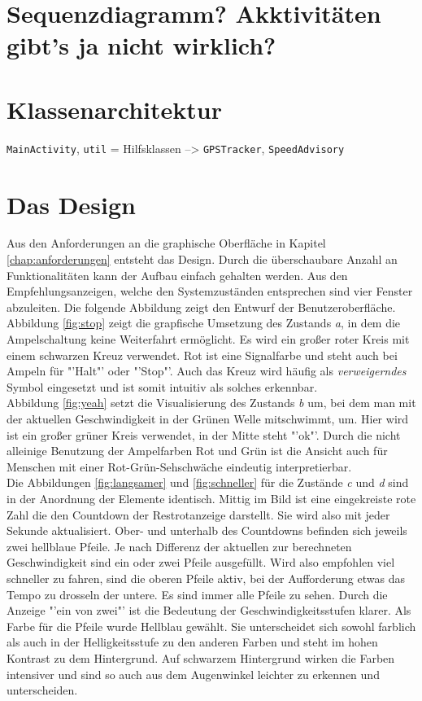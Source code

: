 \section{Sequenzdiagramm? Akktivitäten gibt's ja nicht wirklich?}
\section{Klassenarchitektur}
\texttt{MainActivity},  \texttt{util} = Hilfsklassen --> \texttt{GPSTracker}, \texttt{SpeedAdvisory}
\section{Das Design}
Aus den Anforderungen an die graphische Oberfläche in Kapitel \ref{chap:anforderungen} entsteht das Design. Durch die überschaubare Anzahl an Funktionalitäten kann der Aufbau einfach gehalten werden. Aus den Empfehlungsanzeigen, welche den Systemzuständen entsprechen sind vier Fenster abzuleiten. Die folgende Abbildung zeigt den Entwurf der Benutzeroberfläche. \\
Abbildung \ref{fig:stop} zeigt die grapfische Umsetzung des Zustands \textit{a}, in dem die Ampelschaltung keine Weiterfahrt ermöglicht. Es wird ein großer roter Kreis mit einem schwarzen Kreuz verwendet. Rot ist eine Signalfarbe und steht auch bei Ampeln für "'Halt"' oder "'Stop"'. Auch das Kreuz wird häufig als \textit{verweigerndes} Symbol eingesetzt und ist somit intuitiv als solches erkennbar.\\
Abbildung \ref{fig:yeah} setzt die Visualisierung des Zustands \textit{b} um, bei dem man mit der aktuellen Geschwindigkeit in der Grünen Welle mitschwimmt, um. Hier wird ist ein großer grüner Kreis verwendet, in der Mitte steht "'ok"'. Durch die nicht alleinige Benutzung der Ampelfarben Rot und Grün ist die Ansicht auch für Menschen mit einer Rot-Grün-Sehschwäche eindeutig interpretierbar.\\
Die Abbildungen \ref{fig:langsamer} und \ref{fig:schneller} für die Zustände \textit{c} und \textit{d} sind in der Anordnung der Elemente identisch. Mittig im Bild ist eine eingekreiste rote Zahl die den Countdown der Restrotanzeige darstellt. Sie wird also mit jeder Sekunde aktualisiert. Ober- und unterhalb des Countdowns befinden sich jeweils zwei hellblaue Pfeile. Je nach Differenz der aktuellen zur berechneten Geschwindigkeit sind ein oder zwei Pfeile ausgefüllt. Wird also empfohlen viel schneller zu fahren, sind die oberen Pfeile aktiv, bei der Aufforderung etwas das Tempo zu drosseln der untere. Es sind immer alle Pfeile zu sehen. Durch die Anzeige "'ein von zwei"' ist die Bedeutung der Geschwindigkeitsstufen klarer. Als Farbe für die Pfeile wurde Hellblau gewählt. Sie unterscheidet sich sowohl farblich als auch in der Helligkeitsstufe zu den anderen Farben und steht im hohen Kontrast zu dem Hintergrund. Auf schwarzem Hintergrund wirken die Farben intensiver und sind so auch aus dem Augenwinkel leichter zu erkennen und unterscheiden. 

